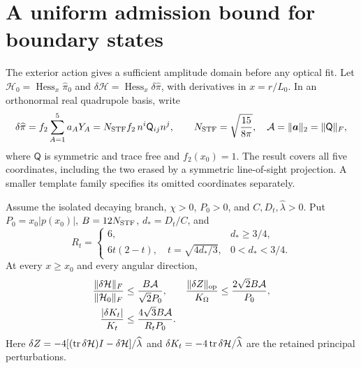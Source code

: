 \section{A uniform admission bound for boundary states}
\label{sec:admission-bound}

The exterior action gives a sufficient amplitude domain before any optical
fit. Let $\mathcal H_0=\operatorname{Hess}_x\widehat\pi_0$ and
$\delta\mathcal H=\operatorname{Hess}_x\delta\widehat\pi$, with derivatives
in $x=r/L_0$. In an orthonormal real quadrupole basis, write
\begin{equation}
 \delta\widehat\pi=f_2\sum_{A=1}^5a_AY_A
 =N_{\rm STF}f_2\,n^i\mathsf Q_{ij}n^j,\qquad
 N_{\rm STF}=\sqrt{\frac{15}{8\pi}},\quad
 \mathcal A=\|\boldsymbol a\|_2=\|\mathsf Q\|_F,
 \label{eq:admission-state}
\end{equation}
where $\mathsf Q$ is symmetric and trace free and $f_2(x_0)=1$.
The result covers all five coordinates, including the two erased by a
symmetric line-of-sight projection. A smaller template family specifies
its omitted coordinates separately.

\begin{proposition}
\label{prop:admission-bound}
Assume the isolated decaying branch, $\chi>0$, $P_0>0$, and
$C,D_t,\widehat\lambda>0$. Put $P_0=x_0|p(x_0)|$,
$B=12N_{\rm STF}$, $d_*=D_t/C$, and
\begin{equation}
 R_t=\begin{cases}
 6,&d_*\ge3/4,\\
 6t(2-t),\quad t=\sqrt{4d_*/3},&0<d_*<3/4.
 \end{cases}
 \label{eq:admission-time-minimum}
\end{equation}
At every $x\ge x_0$ and every angular direction,
\begin{align}
 \frac{\|\delta\mathcal H\|_F}{\|\mathcal H_0\|_F}
 &\le\frac{B\mathcal A}{\sqrt2P_0},&
 \frac{\|\delta Z\|_{\rm op}}{K_\Omega}
 &\le\frac{2\sqrt2B\mathcal A}{P_0},\nonumber\\
 \frac{|\delta K_t|}{K_t}
 &\le\frac{4\sqrt3B\mathcal A}{R_tP_0}.&&
 \label{eq:admission-uniform-bounds}
\end{align}
Here $\delta Z=-4[(\operatorname{tr}\delta\mathcal H)I-\delta\mathcal H]/
\widehat\lambda$ and $\delta K_t=-4\operatorname{tr}\delta\mathcal H/
\widehat\lambda$ are the retained principal perturbations.
\end{proposition}

